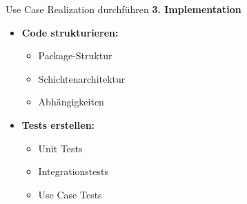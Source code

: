\begin{KR}{Use Case Realization durchführen}
\textbf{3. Implementation}
\begin{itemize}
    \item \textbf{Code strukturieren:}
    \begin{itemize}
        \item Package-Struktur
        \item Schichtenarchitektur
        \item Abhängigkeiten
    \end{itemize}
    
    \item \textbf{Tests erstellen:}
    \begin{itemize}
        \item Unit Tests
        \item Integrationstests
        \item Use Case Tests
    \end{itemize}
\end{itemize}
\end{KR}

